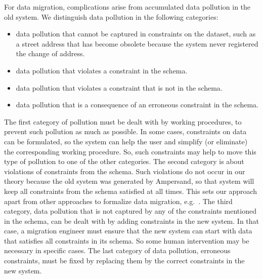 \documentclass{elsarticle}
\begin{document}
   For data migration, complications arise from accumulated data pollution in the old system.
   We distinguish data pollution in the following categories:
\begin{itemize}
   \item data pollution that cannot be captured in constraints on the dataset,
   such as a street address that has become obsolete because the system never registered the change of address.
   \item data pollution that violates a constraint in the schema.
   \item data pollution that violates a constraint that is not in the schema.
   \item data pollution that is a consequence of an erroneous constraint in the schema.
\end{itemize}
   The first category of pollution must be dealt with by working procedures, to prevent such pollution as much as possible.
   In some cases, constraints on data can be formulated,
   so the system can help the user and simplify (or eliminate) the corresponding working procedure.
   So, such constraints may help to move this type of pollution to one of the other categories.
   The second category is about violations of constraints from the schema.
   Such violations do not occur in our theory because the old system was generated by Ampersand,
   so that system will keep all constraints from the schema satisfied at all times.
   This sets our approach apart from other approaches to formalize data migration, e.g.~\cite{Thalheim2013}.
   The third category, data pollution that is not captured by any of the constraints mentioned in the schema,
   can be dealt with by adding constraints in the new system.
   In that case, a migration engineer must ensure that the new system can start with data that satisfies all constraints in its schema.
   So some human intervention may be necessary in specific cases.
   The last category of data pollution, erroneous constraints, must be fixed by replacing them by the correct constraints in the new system.
\end{document}
